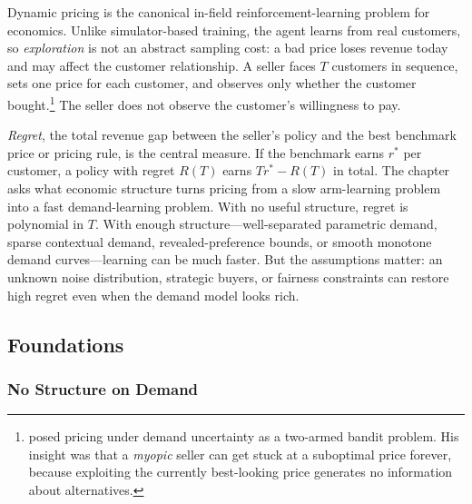 Dynamic pricing is the canonical in-field reinforcement-learning problem for economics. Unlike simulator-based training, the agent learns from real customers, so \textit{exploration} is not an abstract sampling cost: a bad price loses revenue today and may affect the customer relationship. A seller faces $T$ customers in sequence, sets one price for each customer, and observes only whether the customer bought.\footnote{\citet{Rothschild1974} posed pricing under demand uncertainty as a two-armed bandit problem. His insight was that a \textit{myopic} seller can get stuck at a suboptimal price forever, because exploiting the currently best-looking price generates no information about alternatives.} The seller does not observe the customer's willingness to pay.

\textit{Regret}, the total revenue gap between the seller's policy and the best benchmark price or pricing rule, is the central measure. If the benchmark earns $r^*$ per customer, a policy with regret $R(T)$ earns $T r^* - R(T)$ in total. The chapter asks what economic structure turns pricing from a slow arm-learning problem into a fast demand-learning problem. With no useful structure, regret is polynomial in $T$. With enough structure---well-separated parametric demand, sparse contextual demand, revealed-preference bounds, or smooth monotone demand curves---learning can be much faster. But the assumptions matter: an unknown noise distribution, strategic buyers, or fairness constraints can restore high regret even when the demand model looks rich.

\subsection{Foundations}
\label{sec:dp_foundations}

\subsubsection{No Structure on Demand}
\label{sec:kleinberg}

